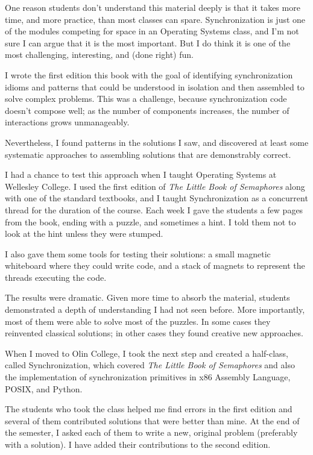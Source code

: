 \documentclass{book}
\begin{document}
One reason students don't understand this material deeply is that it takes more time, and more practice, than most classes can spare. Synchronization is just one of the modules competing for space in an Operating Systems class, and I'm not sure I can argue that it is the most important.  But I do think it is one of the most challenging, interesting, and (done right) fun.

I wrote the first edition this book with the goal of identifying synchronization idioms and patterns that could be understood in isolation and then assembled to solve complex problems. This was a challenge, because synchronization code doesn't compose well; as the number of components increases, the number of interactions grows unmanageably.

Nevertheless, I found patterns in the solutions I saw, and discovered at least some systematic approaches to assembling solutions that are demonstrably correct.

I had a chance to test this approach when I taught Operating Systems at Wellesley College.  I used the first edition of {\em The Little Book of Semaphores} along with one of the standard textbooks, and I taught Synchronization as a concurrent thread for the duration of the course.  Each week I gave the students a few pages from the book, ending with a puzzle, and sometimes a hint.  I told them not to look at the hint unless they were stumped.

I also gave them some tools for testing their solutions: a small magnetic whiteboard where they could write code, and a stack of magnets to represent the threads executing the code.

The results were dramatic.  Given more time to absorb the material, students demonstrated a depth of understanding I had not seen before. More importantly, most of them were able to solve most of the puzzles. In some cases they reinvented classical solutions; in other cases they found creative new approaches.

When I moved to Olin College, I took the next step and created a half-class, called Synchronization, which covered {\em The Little Book of Semaphores} and also the implementation of synchronization primitives in x86 Assembly Language, POSIX, and Python.

The students who took the class helped me find errors in the first edition and several of them contributed solutions that were better than mine. At the end of the semester, I asked each of them to write a new, original problem (preferably with a solution). I have added their contributions to the second edition.
\end{document}
